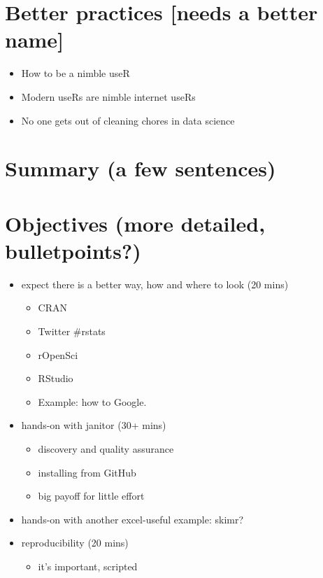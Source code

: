\documentclass[]{book}
\providecommand{\tightlist}{%
  \setlength{\itemsep}{0pt}\setlength{\parskip}{0pt}}
\begin{document}
\hypertarget{better-practices-needs-a-better-name}{%
\section{Better practices {[}needs a better name{]}}\label{better-practices-needs-a-better-name}}

\begin{itemize}
\tightlist
\item
  How to be a nimble useR
\item
  Modern useRs are nimble internet useRs
\item
  No one gets out of cleaning chores in data science
\end{itemize}

\hypertarget{summary-a-few-sentences-3}{%
\section{Summary (a few sentences)}\label{summary-a-few-sentences-3}}

\hypertarget{objectives-more-detailed-bulletpoints-3}{%
\section{Objectives (more detailed, bulletpoints?)}\label{objectives-more-detailed-bulletpoints-3}}

\begin{itemize}
\tightlist
\item
  expect there is a better way, how and where to look (20 mins)

  \begin{itemize}
  \tightlist
  \item
    CRAN
  \item
    Twitter \#rstats
  \item
    rOpenSci
  \item
    RStudio
  \item
    Example: how to Google.
  \end{itemize}
\item
  hands-on with janitor (30+ mins)

  \begin{itemize}
  \tightlist
  \item
    discovery and quality assurance
  \item
    installing from GitHub
  \item
    big payoff for little effort
  \end{itemize}
\item
  hands-on with another excel-useful example: skimr?\\
\item
  reproducibility (20 mins)

  \begin{itemize}
  \tightlist
  \item
    it's important, scripted
  \end{itemize}
\end{itemize}
\end{document}
